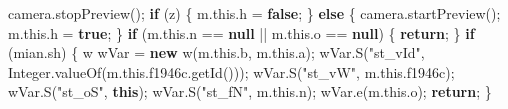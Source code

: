 \documentclass[
]{article}
\newenvironment{Shaded}{}{}
\newcommand{\BuiltInTok}[1]{\textcolor[rgb]{0.00,0.50,0.00}{#1}}
\newcommand{\ControlFlowTok}[1]{\textcolor[rgb]{0.00,0.44,0.13}{\textbf{#1}}}
\newcommand{\FunctionTok}[1]{\textcolor[rgb]{0.02,0.16,0.49}{#1}}
\newcommand{\KeywordTok}[1]{\textcolor[rgb]{0.00,0.44,0.13}{\textbf{#1}}}
\newcommand{\NormalTok}[1]{#1}
\newcommand{\OperatorTok}[1]{\textcolor[rgb]{0.40,0.40,0.40}{#1}}
\newcommand{\StringTok}[1]{\textcolor[rgb]{0.25,0.44,0.63}{#1}}
\begin{document}
\begin{Shaded}
\begin{Highlighting}[]
\NormalTok{            camera}\OperatorTok{.}\FunctionTok{stopPreview}\OperatorTok{();}
            \ControlFlowTok{if} \OperatorTok{(}\NormalTok{z}\OperatorTok{)} \OperatorTok{\{}
\NormalTok{                m}\OperatorTok{.}\FunctionTok{this}\OperatorTok{.}\FunctionTok{h} \OperatorTok{=} \KeywordTok{false}\OperatorTok{;}
            \OperatorTok{\}} \ControlFlowTok{else} \OperatorTok{\{}
\NormalTok{                camera}\OperatorTok{.}\FunctionTok{startPreview}\OperatorTok{();}
\NormalTok{                m}\OperatorTok{.}\FunctionTok{this}\OperatorTok{.}\FunctionTok{h} \OperatorTok{=} \KeywordTok{true}\OperatorTok{;}
            \OperatorTok{\}}
            \ControlFlowTok{if} \OperatorTok{(}\NormalTok{m}\OperatorTok{.}\FunctionTok{this}\OperatorTok{.}\FunctionTok{n} \OperatorTok{==} \KeywordTok{null} \OperatorTok{||}\NormalTok{ m}\OperatorTok{.}\FunctionTok{this}\OperatorTok{.}\FunctionTok{o} \OperatorTok{==} \KeywordTok{null}\OperatorTok{)} \OperatorTok{\{}
                \ControlFlowTok{return}\OperatorTok{;}
            \OperatorTok{\}}
            \ControlFlowTok{if} \OperatorTok{(}\NormalTok{mian}\OperatorTok{.}\FunctionTok{sh}\OperatorTok{)} \OperatorTok{\{}
\NormalTok{                w wVar }\OperatorTok{=} \KeywordTok{new} \FunctionTok{w}\OperatorTok{(}\NormalTok{m}\OperatorTok{.}\FunctionTok{this}\OperatorTok{.}\FunctionTok{b}\OperatorTok{,}\NormalTok{ m}\OperatorTok{.}\FunctionTok{this}\OperatorTok{.}\FunctionTok{a}\OperatorTok{);}
\NormalTok{                wVar}\OperatorTok{.}\FunctionTok{S}\OperatorTok{(}\StringTok{"st\_vId"}\OperatorTok{,} \BuiltInTok{Integer}\OperatorTok{.}\FunctionTok{valueOf}\OperatorTok{(}\NormalTok{m}\OperatorTok{.}\FunctionTok{this}\OperatorTok{.}\FunctionTok{f1946c}\OperatorTok{.}\FunctionTok{getId}\OperatorTok{()));}
\NormalTok{                wVar}\OperatorTok{.}\FunctionTok{S}\OperatorTok{(}\StringTok{"st\_vW"}\OperatorTok{,}\NormalTok{ m}\OperatorTok{.}\FunctionTok{this}\OperatorTok{.}\FunctionTok{f1946c}\OperatorTok{);}
\NormalTok{                wVar}\OperatorTok{.}\FunctionTok{S}\OperatorTok{(}\StringTok{"st\_oS"}\OperatorTok{,} \KeywordTok{this}\OperatorTok{);}
\NormalTok{                wVar}\OperatorTok{.}\FunctionTok{S}\OperatorTok{(}\StringTok{"st\_fN"}\OperatorTok{,}\NormalTok{ m}\OperatorTok{.}\FunctionTok{this}\OperatorTok{.}\FunctionTok{n}\OperatorTok{);}
\NormalTok{                wVar}\OperatorTok{.}\FunctionTok{e}\OperatorTok{(}\NormalTok{m}\OperatorTok{.}\FunctionTok{this}\OperatorTok{.}\FunctionTok{o}\OperatorTok{);}
                \ControlFlowTok{return}\OperatorTok{;}
            \OperatorTok{\}}

\end{Highlighting}
\end{Shaded}
\end{document}
